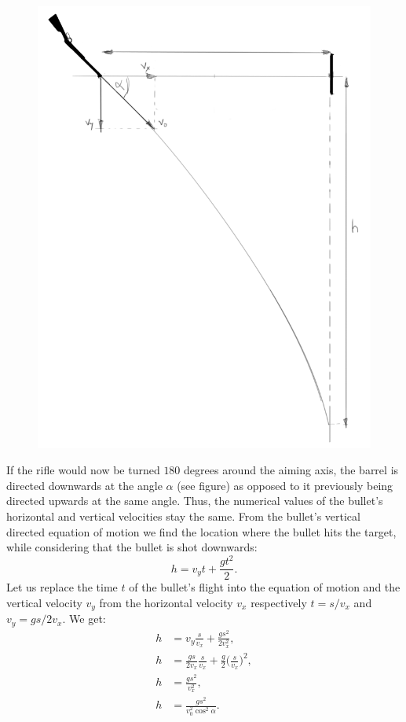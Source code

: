 \documentclass[11pt]{article}
\begin{document}
\begin{figure}
	\vspace{-20pt}
	\includegraphics[width = \linewidth]{2016-v2g-06-Lasketiir-2.PNG}
\end{figure}
If the rifle would now be turned $180$ degrees around the aiming axis, the barrel is directed downwards at the angle $\alpha$ (see figure) as opposed to it previously being directed upwards at the same angle. Thus, the numerical values of the bullet’s horizontal and vertical velocities stay the same. From the bullet’s vertical directed equation of motion we find the location where the bullet hits the target, while considering that the bullet is shot downwards:
$$
h=v_{y}t+\frac{gt^2}{2}.
$$ 
Let us replace the time $t$ of the bullet’s flight into the equation of motion and the vertical velocity $v_y$ from the horizontal velocity $v_x$ respectively $t=s / v_x$ and $v_y = gs/2v_x$. We get:
\begin{align*}
h & = v_{y}\frac{s}{v_{x}}+\frac{gs^2}{2v_{x}^2},\\
h & = \frac{gs}{2v_x}\frac{s}{v_{x}}+\frac{g}{2}\Big(\frac{s}{v_{x}}\Big)^2,\\
h & = \frac{gs^2}{v_{x}^2},\\
h & = \frac{gs^2}{v_{0}^2\cos^2\alpha}.
\end{align*} 
\end{document}
